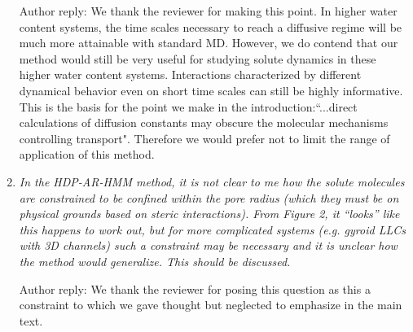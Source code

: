 \documentclass{article}
\begin{document}
\begin{enumerate}[label={Comment \theenumi :}, leftmargin=3.9\parindent]
    Author reply: We thank the reviewer for making this point. In higher water content systems, 
    the time scales necessary to reach a diffusive regime will be much more attainable with 
    standard MD.
    However, we do contend that our method would still be very useful for studying
    solute dynamics in these higher water content systems.
    Interactions characterized by different
    dynamical behavior even on short time scales can still be highly informative. This is the
    basis for the point we make in the introduction:``...direct calculations of diffusion 
    constants may obscure the molecular mechanisms controlling transport". Therefore we would
    prefer not to limit the range of application of this method. 
    \item \textit{In the HDP-AR-HMM method, it is not clear to me how the solute molecules are 
    constrained to be confined within the pore radius (which they must be on physical grounds 
    based on steric interactions). From Figure 2, it “looks” like this happens to work out, but
    for more complicated systems (e.g. gyroid LLCs with 3D channels) such a constraint may be 
    necessary and it is unclear how the method would generalize. This should be discussed.}
    
    Author reply: We thank the reviewer for posing this question as this a constraint to which 
    we gave thought but neglected to emphasize in the main text. 



\end{enumerate}
\end{document}
